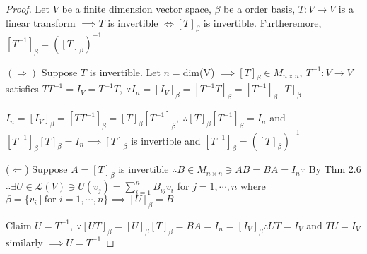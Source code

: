 \begin{proof}
	Let $V$ be a finite dimension vector space, $\beta$ be a order basis, $T:V \rightarrow V$ is a linear transform $\implies T$ is invertible $\Leftrightarrow [T]_{\beta}$ is invertible. Furtheremore, $[T^{-1}]_{\beta} = ([T]_{\beta})^{-1}$
	
	$(\Rightarrow)$ Suppose $T$ is invertible. Let $n = $dim(V) $\implies [T]_{\beta} \in M_{n \times n},~ T^{-1}:V \rightarrow V$ satisfies $TT^{-1} = I_V = T^{-1}T,~\because I_n = [I_V]_{\beta} = [T^{-1}T]_{\beta} = [T^{-1}]_{\beta}[T]_{\beta}$
	
	$I_n = [I_V]_{\beta} = [TT^{-1}]_{\beta} = [T]_{\beta}[T^{-1}]_{\beta} , ~ \therefore [T]_{\beta}[T^{-1}]_{\beta} = I_n$ and $[T^{-1}]_{\beta}[T]_{\beta} = I_n \implies [T]_{\beta}$ is invertible and $[T^{-1}]_{\beta} = ([T]_{\beta})^{-1}$
	
	($\Leftarrow$) Suppose $A = [T]_{\beta}$ is invertible $\therefore B \in M_{n \times n} \ni AB = BA = I_n \because$ By Thm 2.6 $\therefore \exists U \in \mathscr{L}(V) \ni U(v_j) = \sum^{n}_{i = 1} B_{ij}v_i$ for $j = 1,\cdots,n$ where $\beta = \{v_i ~|~ \text{for } i = 1,\cdots,n\} \implies [U]_{\beta} = B$
	
	Claim $U = T^{-1},~\because [UT]_{\beta} = [U]_{\beta}[T]_{\beta} = BA = I_n = [I_V]_{\beta} \therefore UT = I_V$ and $TU = I_V$ similarly $\implies U = T^{-1}$ 
\end{proof}
